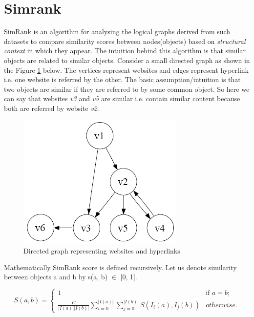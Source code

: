 \section{Simrank}

SimRank \cite{SimRank} is an algorithm for analysing the logical graphs derived from such datasets to compare similarity scores between nodes(objects) based on \emph{structural context} in which they appear. The intuition behind this algorithm is that similar objects are related to similar objects. Consider a small directed graph as shown in the Figure \ref{fig:simrank} below. The vertices represent websites and edges represent hyperlink i.e. one website is referred by the other. The basic assumption/intuition is that two objects are similar if they are referred to by some common object. So here we can say that websites \emph{v3} and \emph{v5} are similar i.e. contain similar content because both are referred by website \emph{v2}.

\begin{figure}[htb]
\centering
\includegraphics[scale=0.5]{simrank}
\caption{Directed graph representing websites and hyperlinks}
\label{fig:simrank}
\end{figure}

Mathematically SimRank score is defined recursively. Let us denote similarity between objects a and b by s(a, b) $\in$ [0, 1].


\begin{equation}
S(a, b) =	\left\{ \begin{array}{ll}
			1 & \mbox{if $a=b$}; \\
			\frac{C}{\left | I(a) \right | \left | I(b) \right |}\sum_{i = 0}^{\left | I(a) \right |}\sum_{j = 0}^{\left | I(b) \right |}S\left(I_i\left(a\right), I_j\left(b\right ) \right) & \mbox{$otherwise$}.\end{array} \right.
\end{equation}

